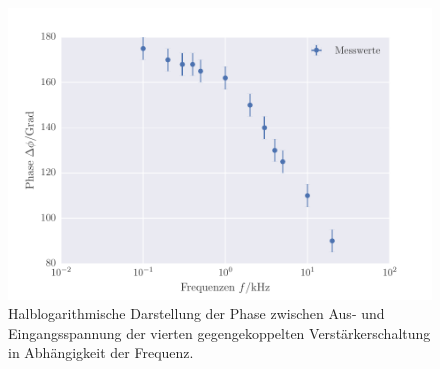 \FloatBarrier
\begin{figure}[!h]
\centering
\includegraphics[scale=1]{../Grafiken/Gegengekoppelter_Verstaerker_Phase.pdf}
\caption{Halblogarithmische Darstellung der Phase zwischen Aus- und Eingangsspannung der vierten gegengekoppelten 
	Verstärkerschaltung in Abhängigkeit der Frequenz. \label{fig:gegengekoppelter_verstaerker_phase}}
\end{figure}
\FloatBarrier